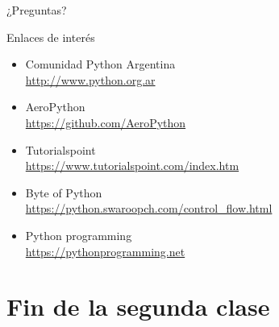 \documentclass[10pt]{beamer}
\begin{document}
\begin{frame}[standout]
	¿Preguntas?
\end{frame}

\appendix

\begin{frame}{Enlaces de interés}
	\begin{itemize}
		\item \alert{Comunidad Python Argentina}\\ \url{http://www.python.org.ar}
		\item \alert{AeroPython}\\ \url{https://github.com/AeroPython}
		\item \alert{Tutorialspoint}\\ \url{https://www.tutorialspoint.com/index.htm}
		\item \alert{Byte of Python}\\ \url{https://python.swaroopch.com/control_flow.html}
		\item \alert{Python programming}\\ \url{https://pythonprogramming.net}
	\end{itemize}
\end{frame}
\section{Fin de la segunda clase}
\end{document}
